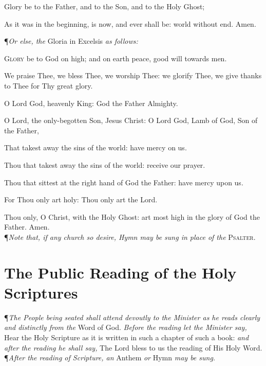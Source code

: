 Glory be to the Father, and to the Son, and to the Holy Ghost; \par
As it was in the beginning, is now, and ever shall be: world without end. Amen. \par
\vspace{1ex}
{\centering \P \textit{Or else, the} Gloria in Excelsis \textit{as follows:} \par}
\vspace{1ex}
\lettrine{G}{lory} be to God on high; and on earth peace, good will towards men. \par
We praise Thee, we bless Thee, we worship Thee: we glorify Thee, we give thanks to Thee for Thy great glory. \par
O Lord God, heavenly King: God the Father Almighty. \par
O Lord, the only-begotten Son, Jesus Christ: O Lord God, Lamb of God, Son of the Father, \par
That takest away the sins of the world: have mercy on us. \par
Thou that takest away the sins of the world: receive our prayer. \par
Thou that sittest at the right hand of God the Father: have mercy upon us. \par
For Thou only art holy: Thou only art the Lord. \par
Thou only, O Christ, with the Holy Ghost: art most high in the glory of God the Father.
Amen. \\

\noindent\P \textit{Note that, if any church so desire, Hymn may be sung in place of the} \textsc{Psalter.}

\section*{The Public Reading of the Holy Scriptures}

\P \textit{The People being seated shall attend devoutly to the Minister as he reads clearly and distinctly from the} Word of God. \textit{Before the reading let the Minister say,} Hear the Holy Scripture as it is written in such a chapter of such a book: \textit{and after the reading he shall say,} The Lord bless to us the reading of His Holy Word. \\

\noindent\P \textit{After the reading of Scripture, an} Anthem \textit{or} Hymn \textit{may be sung.} \\

